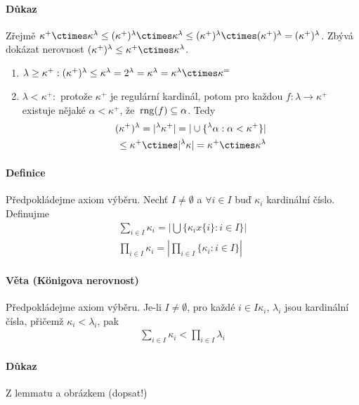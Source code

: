 \documentclass[a4paper,12pt,titlepage]{article}
\begin{document}
\begin{enumerate}
\paragraph{Důkaz}
Zřejmě $\kappa^+ \ctimes \kappa^\lambda \le (\kappa^+)^\lambda \ctimes
\kappa^\lambda \le (\kappa^+)^\lambda \ctimes (\kappa^+)^\lambda =
(\kappa^+)^\lambda$. Zbývá dokázat nerovnost $(\kappa^+)^\lambda \le \kappa^+
\ctimes \kappa^\lambda$.
\begin{enumerate}
	\item  $\lambda \ge \kappa^+: (\kappa^+)^\lambda \le \kappa^\lambda =
	2^\lambda = \kappa^\lambda = \kappa^\lambda \ctimes \kappa^=$
	\item $\lambda < \kappa^+: $ protože $\kappa^+$ je regulární kardinál, potom
	pro každou $f: \lambda \to \kappa^+$ existuje nějaké $\alpha < \kappa^+$, že
	$\operatorname*{\,rng}(f) \subseteq \alpha$. Tedy 
	\begin{align}
		(\kappa^+)^\lambda = | ^\lambda \kappa^+| = | \cup \{ ^\lambda \alpha :
		\alpha < \kappa^+ \} | \\
		\le \kappa^+ \ctimes | ^\lambda \kappa| = \kappa^+ \ctimes
		\kappa^\lambda
	\end{align}
\end{enumerate}
\paragraph{Definice}
Předpokládejme axiom výběru. Nechť $I \neq \emptyset$ a $\forall i \in I$ buď
$\kappa_i$ kardinální číslo. Definujme 
\begin{align}
	\sum_{i\in I} \kappa_i = \left| \bigcup \{\kappa_i x \{i\}: i \in I
	\}\right| \\
	\prod_{i\in I} \kappa_i = \left| \prod_{i \in I} \{\kappa_i: i \in I\} \right |
\end{align}
\paragraph{Věta (Königova nerovnost)}
Předpokládejme axiom výběru. Je-li $I \neq \emptyset$, pro každé $i \in I
\kappa_i$, $\lambda_i$ jsou kardinální čísla, přičemž $\kappa_i <\lambda_i$, pak 
\begin{align}
	\sum_{i\in I} \kappa_i < \prod_{i\in I} \lambda_i
\end{align}
\paragraph{Důkaz}
Z lemmatu a obrázkem (dopsat!)




\end{enumerate}
\end{document}
